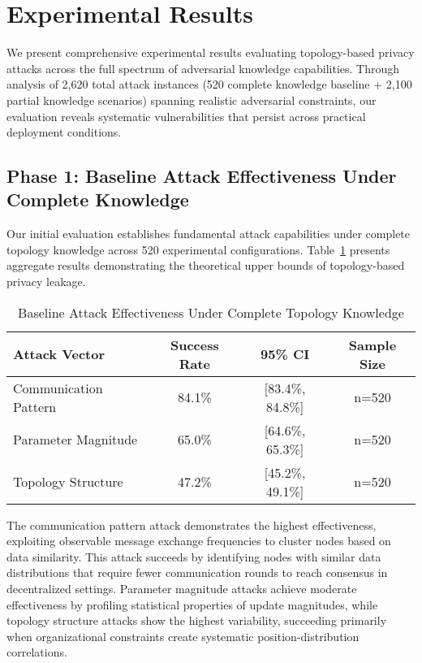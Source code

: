 
\section{Experimental Results}
\label{sec:results}

We present comprehensive experimental results evaluating topology-based privacy attacks across the full spectrum of adversarial knowledge capabilities. Through analysis of 2,620 total attack instances (520 complete knowledge baseline + 2,100 partial knowledge scenarios) spanning realistic adversarial constraints, our evaluation reveals systematic vulnerabilities that persist across practical deployment conditions.

\subsection{Phase 1: Baseline Attack Effectiveness Under Complete Knowledge}

Our initial evaluation establishes fundamental attack capabilities under complete topology knowledge across 520 experimental configurations. Table~\ref{tab:baseline_effectiveness} presents aggregate results demonstrating the theoretical upper bounds of topology-based privacy leakage.

\begin{table}[!t]
\caption{Baseline Attack Effectiveness Under Complete Topology Knowledge}
\label{tab:baseline_effectiveness}
\centering
\footnotesize
\begin{tabular}{@{}lccc@{}}
\toprule
\textbf{Attack Vector} & \textbf{Success Rate} & \textbf{95\% CI} & \textbf{Sample Size} \\
\midrule
Communication Pattern & 84.1\% & [83.4\%, 84.8\%] & n=520 \\
Parameter Magnitude & 65.0\% & [64.6\%, 65.3\%] & n=520 \\
Topology Structure & 47.2\% & [45.2\%, 49.1\%] & n=520 \\
\bottomrule
\end{tabular}
\end{table}

The communication pattern attack demonstrates the highest effectiveness, exploiting observable message exchange frequencies to cluster nodes based on data similarity. This attack succeeds by identifying nodes with similar data distributions that require fewer communication rounds to reach consensus in decentralized settings. Parameter magnitude attacks achieve moderate effectiveness by profiling statistical properties of update magnitudes, while topology structure attacks show the highest variability, succeeding primarily when organizational constraints create systematic position-distribution correlations.

